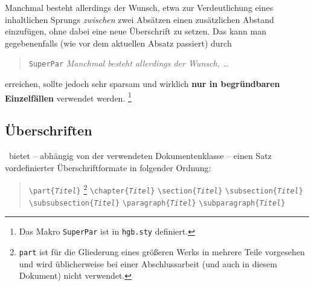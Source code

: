 \SuperPar 
Manchmal besteht allerdings der Wunsch, etwa zur Verdeutlichung eines inhaltlichen Sprungs \emph{zwischen} zwei Absätzen einen zusätzlichen Abstand einzufügen, ohne dabei eine neue Überschrift zu setzen. Das kann man gegebenenfalls (wie vor dem aktuellen Absatz passiert) durch 
%
\begin{quote}
\texttt{{\bs}SuperPar} \emph{Manchmal besteht allerdings der Wunsch, \ldots}
\end{quote}
%
erreichen, sollte jedoch sehr sparsam und wirklich \textbf{nur in begründbaren Einzelfällen} verwendet werden.%
\footnote{Das Makro \texttt{{\bs}SuperPar} ist in \texttt{hgb.sty} definiert.}




\subsection{Überschriften}
\label{sec:ueberschriften}

\latex\ bietet -- abhängig von der verwendeten Dokumentenklasse --
einen Satz vordefinierter Überschriftformate in folgender Ordnung:
%
\begin{quote}
\verb!\part{!\texttt{\em Titel}\verb!}!%
\footnote{\texttt{part} ist für die Gliederung eines
größeren Werks in mehrere Teile vorgesehen und wird üblicherweise
bei einer Abschlussarbeit (und auch in diesem Dokument) nicht
verwendet.}
\newline%
\verb!\chapter{!\texttt{\em Titel}\verb!}! \newline%
\verb!\section{!\texttt{\em Titel}\verb!}! \newline%
\verb!\subsection{!\texttt{\em Titel}\verb!}! \newline%
\verb!\subsubsection{!\texttt{\em Titel}\verb!}! \newline%
\verb!\paragraph{!\texttt{\em Titel}\verb!}! \newline%
\verb!\subparagraph{!\texttt{\em Titel}\verb!}!
\end{quote}
%

